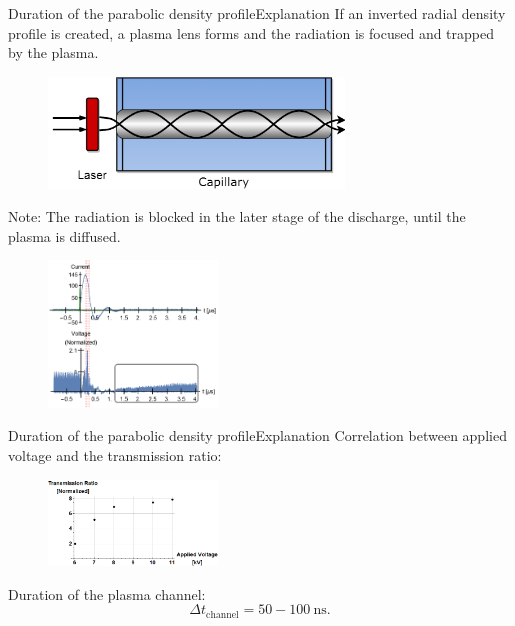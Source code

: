 \documentclass[draft]{beamer}
\begin{document}
  \begin{frame}{Duration of the parabolic density profile}{Explanation}
    If an inverted radial density profile is created, a plasma lens forms and the radiation is focused and trapped by the plasma.
    \begin{figure}
      \includegraphics[width=0.7\textwidth]{figures/results/oscillator/chen4_31.png}
    \end{figure}
    Note: The radiation is blocked in the later stage of the discharge, until the plasma is diffused.
    \begin{figure}
      \includegraphics[width=0.4\textwidth]{figures/results/oscillator/not_opaque.PNG}
    \end{figure}
  \end{frame}
  \begin{frame}{Duration of the parabolic density profile}{Explanation}
    Correlation between applied voltage and the transmission ratio:
    \begin{figure}
      \includegraphics[width=0.4\textwidth]{figures/results/oscillator/voltage vs guiding.png}
    \end{figure}
    Duration of the plasma channel:
    \begin{equation*}
      \Delta t_\text{channel}=50 -100\ \si{\ns}.
    \end{equation*}
  \end{frame}
\end{document}

